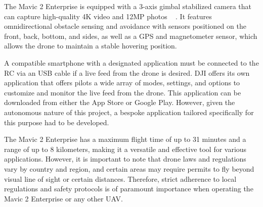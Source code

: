 The Mavic 2 Enterprise is equipped with a 3-axis gimbal stabilized camera that can capture high-quality 4K video and 12MP photos ~\cite{DJI2018MavicDJI}  . It features omnidirectional obstacle sensing and avoidance with sensors positioned on the front, back, bottom, and sides, as well as a GPS and magnetometer sensor, which allows the drone to maintain a stable hovering position.
\newline

A compatible smartphone with a designated application must be connected to the RC via an USB cable if a live feed from the drone is desired. DJI offers its own application that offers pilots a wide array of modes, settings, and options to customize and monitor the live feed from the drone. This application can be downloaded from either the App Store or Google Play. However, given the autonomous nature of this project, a bespoke application tailored specifically for this purpose had to be developed.
\newline 

The Mavic 2 Enterprise has a maximum flight time of up to 31 minutes and a range of up to 8 kilometers, making it a versatile and effective tool for various applications. However, it is important to note that drone laws and regulations vary by country and region, and certain areas may require permits to fly beyond visual line of sight or certain distances. Therefore, strict adherence to local regulations and safety protocols is of paramount importance when operating the Mavic 2 Enterprise or any other UAV.



